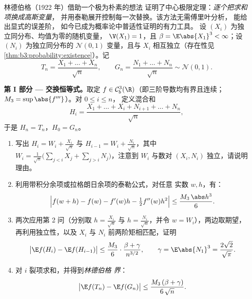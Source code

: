 \begin{problem}
\label{pb:b3:clt:1}
林德伯格（1922 年）借助一个极为朴素的想法
证明了中心极限定理：\emph{逐个把求和项换成高斯变量}，
并用泰勒展开控制每一次替换。该方法无需傅里叶分析，
能给出显式的误差阶，
如今已成为概率论中普适性证明的有力工具。
设 $(X_i)$ 为独立同分布、均值为零的随机变量，
$\V(X_1) = 1$，且 $\beta = \E\abs{X_1}^3 < \infty$；设
$(N_i)$ 为独立同分布的 $\mathcal N(0,1)$ 变量，且与
$X_i$ 相互独立（存在性见\cref{thm:b3:probability:existence}）。记
\[
T_n = \frac{X_1 + \dots + X_n}{\sqrt n},
\qquad
G_n = \frac{N_1 + \dots + N_n}{\sqrt n} \sim \mathcal N(0,1).
\]

\medskip
\noindent\textbf{第 I 部分 --- 交换恒等式。}取定 $f
\in \mathcal C^3_b(\R)$（即三阶导数均有界且连续；
$M_3 = \sup\abs{f'''}$）。对 $0 \leq i \leq n$，
定义混合和
\[
H_i = \frac{X_1 + \dots + X_i + N_{i+1} + \dots +
N_n}{\sqrt n},
\]
于是 $H_n = T_n$，$H_0 = G_n$。
\begin{enumerate}
  \item 写出 $H_i = W_i + \frac{X_i}{\sqrt n}$ 与 $H_{i-1}
        = W_i + \frac{N_i}{\sqrt n}$，其中 $W_i =
        \frac{1}{\sqrt n}\bigl(\sum_{j<i}X_j +
        \sum_{j>i}N_j\bigr)$，注意到 $W_i$
        与数对 $(X_i, N_i)$ 独立，请说明理由。
  \item 利用带积分余项或拉格朗日余项的泰勒公式，对任意
        实数 $w, h$，有：
        \[
        \Bigl|f(w + h) - f(w) - f'(w)h -
        \tfrac12f''(w)h^2\Bigr| \leq
        \frac{M_3\,\abs h^3}{6} .
        \]
  \item 两次应用第 2 问（分别取 $h = \frac{X_i}{\sqrt n}$ 与
        $h = \frac{N_i}{\sqrt n}$，并令 $w = W_i$），两边取期望，
        再利用独立性，以及
        $X_i$ 与 $N_i$ 前两阶矩相匹配，证明
        \[
        \bigl|\E f(H_i) - \E f(H_{i-1})\bigr|
        \leq \frac{M_3}{6}\cdot
        \frac{\beta + \gamma}{n^{3/2}},
        \qquad \gamma = \E\abs{N_1}^3 =
        \frac{2\sqrt2}{\sqrt\pi} .
        \]
  \item 对 $i$ 裂项求和，并得到\emph{林德伯格
        界}：
        \[
        \bigl|\E f(T_n) - \E f(G_n)\bigr| \leq
        \frac{M_3\,(\beta + \gamma)}{6\,\sqrt n} .
        \]
\end{enumerate}


\end{problem}
